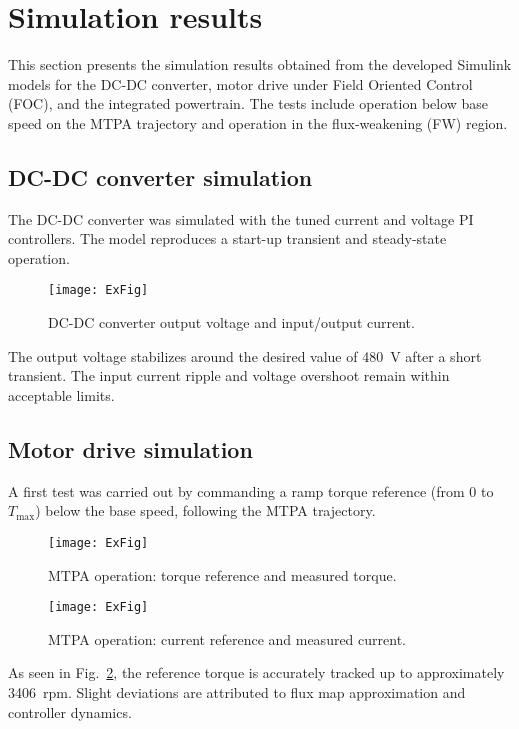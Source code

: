 \section{Simulation results}

This section presents the simulation results obtained from the developed Simulink models for the DC-DC converter, motor drive under Field Oriented Control (FOC), and the integrated powertrain. The tests include operation below base speed on the MTPA trajectory and operation in the flux-weakening (FW) region.

\subsection{DC-DC converter simulation}

The DC-DC converter was simulated with the tuned current and voltage PI controllers. The model reproduces a start-up transient and steady-state operation.

\begin{figure}[H]
\centering
\texttt{[image: ExFig]}
\caption{DC-DC converter output voltage and input/output current.}
\label{fig:DCDC_sim}
\end{figure}

The output voltage stabilizes around the desired value of \SI{480}{\volt} after a short transient. The input current ripple and voltage overshoot remain within acceptable limits.

\subsection{Motor drive simulation}

A first test was carried out by commanding a ramp torque reference (from 0 to $T_{\max}$) below the base speed, following the MTPA trajectory.

\begin{figure}[H]
\centering
\texttt{[image: ExFig]}
\caption{MTPA operation: torque reference and measured torque.}
\label{fig:MTPA_sim}
\end{figure}

\begin{figure}[H]
\centering
\texttt{[image: ExFig]}
\caption{MTPA operation: current reference and measured current.}
\label{fig:MTPA_current}
\end{figure}

As seen in Fig.~\ref{fig:MTPA_sim}, the reference torque is accurately tracked up to approximately \SI{3406}{rpm}. Slight deviations are attributed to flux map approximation and controller dynamics.

